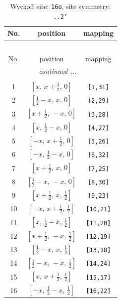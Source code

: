 \documentclass[fleqn,8pt]{jsarticle}
\begin{document}
\renewcommand{\arraystretch}{1.2}
\begin{longtable}{ccc}
\caption{Wyckoff site: {\tt 16o}, site symmetry: {\tt ..2'}}
 \\
 \hline \hline
No. & position & mapping \\ \hline \endfirsthead

\multicolumn{2}{l}{\tablename\ \thetable{}} \\
 \hline \hline
No. & position & mapping \\ \hline \endhead

 \hline \hline
\multicolumn{2}{r}{\footnotesize\it continued ...} \\ \endfoot

 \hline \hline
\multicolumn{2}{r}{} \\ \endlastfoot

1 & $\left[ x,\, x + \frac{1}{2},\, 0 \right]$ & {\tt [1,31]} \\ \hline
2 & $\left[ \frac{1}{2} - x,\, x,\, 0 \right]$ & {\tt [2,29]} \\ \hline
3 & $\left[ x + \frac{1}{2},\, - x,\, 0 \right]$ & {\tt [3,28]} \\ \hline
4 & $\left[ x,\, \frac{1}{2} - x,\, 0 \right]$ & {\tt [4,27]} \\ \hline
5 & $\left[ - x,\, x + \frac{1}{2},\, 0 \right]$ & {\tt [5,26]} \\ \hline
6 & $\left[ - x,\, \frac{1}{2} - x,\, 0 \right]$ & {\tt [6,32]} \\ \hline
7 & $\left[ x + \frac{1}{2},\, x,\, 0 \right]$ & {\tt [7,25]} \\ \hline
8 & $\left[ \frac{1}{2} - x,\, - x,\, 0 \right]$ & {\tt [8,30]} \\ \hline
9 & $\left[ x + \frac{1}{2},\, x,\, \frac{1}{2} \right]$ & {\tt [9,23]} \\ \hline
10 & $\left[ - x,\, x + \frac{1}{2},\, \frac{1}{2} \right]$ & {\tt [10,21]} \\ \hline
11 & $\left[ x,\, \frac{1}{2} - x,\, \frac{1}{2} \right]$ & {\tt [11,20]} \\ \hline
12 & $\left[ x + \frac{1}{2},\, - x,\, \frac{1}{2} \right]$ & {\tt [12,19]} \\ \hline
13 & $\left[ \frac{1}{2} - x,\, x,\, \frac{1}{2} \right]$ & {\tt [13,18]} \\ \hline
14 & $\left[ \frac{1}{2} - x,\, - x,\, \frac{1}{2} \right]$ & {\tt [14,24]} \\ \hline
15 & $\left[ x,\, x + \frac{1}{2},\, \frac{1}{2} \right]$ & {\tt [15,17]} \\ \hline
16 & $\left[ - x,\, \frac{1}{2} - x,\, \frac{1}{2} \right]$ & {\tt [16,22]} \\
\end{longtable}
\end{document}
